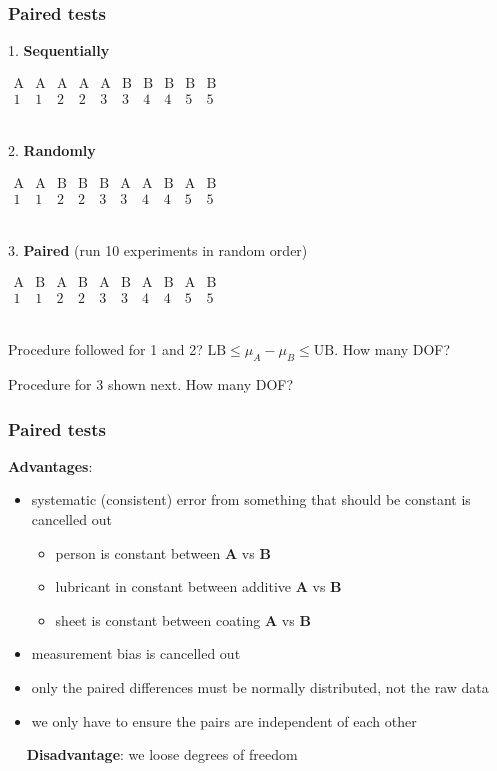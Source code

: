 \begin{frame}\frametitle{Paired tests}

	1. \textbf{Sequentially}

	$
	\begin{array}{cccccccccc}
		\text{A} & \text{A} & \text{A} & \text{A} & \text{A} & \text{B} & \text{B} & \text{B} & \text{B} & \text{B} \\
		1 & 1 & 2 & 2 & 3 & 3 & 4 & 4 & 5 & 5\\
	\end{array}
	$

	$\qquad$

	2. \textbf{Randomly}

	$
	\begin{array}{cccccccccc}
		\text{A} & \text{A} & \text{B} & \text{B} & \text{B} & \text{A} & \text{A} & \text{B} & \text{A} & \text{B} \\
		1 & 1 & 2 & 2 & 3 & 3 & 4 & 4 & 5 & 5\\
	\end{array}
	$

	$\qquad$

	3. \textbf{Paired} (run 10 experiments in random order)

	$
	\begin{array}{cccccccccc}
		\text{A} & \text{B} & \text{A} & \text{B} & \text{A} & \text{B} & \text{A} & \text{B} & \text{A} & \text{B} \\
		1 & 1 & 2 & 2 & 3 & 3 & 4 & 4 & 5 & 5\\
	\end{array}
	$

	$\qquad$

	Procedure followed for 1 and 2? $\text{LB} \leq \mu_A - \mu_B \leq \text{UB}$. How many DOF?

	Procedure for 3 shown next. How many DOF?
\end{frame}

\begin{frame}\frametitle{Paired tests}

	\textbf{Advantages}:
	\begin{itemize}
		\item	systematic (consistent) error from something that should be constant is cancelled out
		\begin{itemize}
			\item	person is constant between \textbf{A} vs \textbf{B}
			\item	lubricant in constant between additive \textbf{A} vs \textbf{B}
			\item	sheet is constant between coating \textbf{A} vs \textbf{B}
		\end{itemize}
		\item	measurement bias is cancelled out
		\item	only the paired differences must be normally distributed, not the raw data
		\item	we only have to ensure the pairs are independent of each other
	\end{itemize}

	$\quad$ \textbf{Disadvantage}: we loose degrees of freedom
\end{frame}

